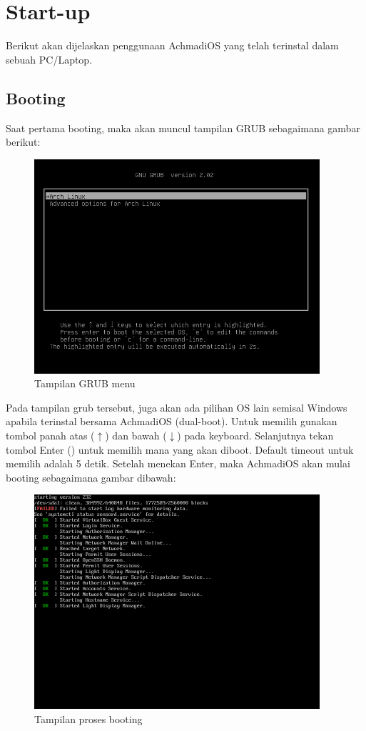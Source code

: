 \documentclass[12pt,]{article}
\begin{document}
	\newpage

	\section{Start-up}

	Berikut akan dijelaskan penggunaan AchmadiOS yang telah terinstal dalam sebuah PC/Laptop.

	\subsection{Booting}

	Saat pertama booting, maka akan muncul tampilan GRUB sebagaimana gambar berikut:

	\begin{figure}[h]
		\centering
		\includegraphics[width=300pt]{png/grub}
		\caption{Tampilan GRUB menu}
	\end{figure}

	Pada tampilan grub tersebut, juga akan ada pilihan OS lain semisal Windows apabila terinstal bersama AchmadiOS (dual-boot).
	Untuk memilih gunakan tombol panah atas ($\uparrow$) dan bawah ($\downarrow$) pada keyboard.
	Selanjutnya tekan tombol Enter (\keys{\return}) untuk memilih mana yang akan diboot.
	Default timeout untuk memilih adalah 5 detik.
	Setelah menekan Enter, maka AchmadiOS akan mulai booting sebagaimana gambar dibawah:

	\begin{figure}[h]
		\centering
		\includegraphics[width=300pt]{png/boot}
		\caption{Tampilan proses booting}
	\end{figure}
\end{document}
